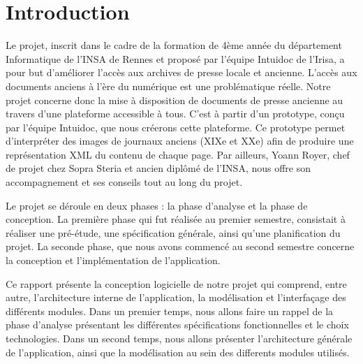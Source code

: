 \section{Introduction}
\label{sec:intro}

Le projet, inscrit dans le cadre de la formation de 4ème année du département Informatique de l’INSA de Rennes et proposé par l’équipe Intuidoc de l’Irisa, a pour but d’améliorer l’accès aux archives de presse locale et ancienne. L’accès aux documents anciens à l’ère du numérique est une problématique réelle. Notre projet concerne donc la mise à disposition de documents de presse ancienne au travers d’une plateforme accessible à tous. C’est à partir d’un prototype, conçu par l’équipe Intuidoc, que nous créerons cette plateforme.
Ce prototype permet d’interpréter des images de journaux anciens (XIXe et XXe) afin de produire une représentation XML du contenu de chaque page. Par ailleurs, Yoann Royer, chef de projet chez Sopra Steria et ancien diplômé de l’INSA, nous offre son accompagnement et ses conseils tout au long du projet.

Le projet se déroule en deux phases : la phase d'analyse et la phase de conception. La première phase qui fut réalisée au premier semestre, consistait à réaliser une pré-étude, une spécification générale, ainsi qu'une planification  du projet. La seconde phase, que nous avons commencé au second semestre concerne la conception et l'implémentation de l'application.

Ce rapport présente la conception logicielle de notre projet qui comprend, entre autre, l'architecture interne de l'application, la modélisation et l'interfaçage des différents modules. Dans un premier temps, nous allons faire un rappel de la phase d'analyse présentant les différentes spécifications fonctionnelles et le choix technologies. Dans un second temps, nous allons présenter l'architecture générale de l'application, ainsi que la modélisation au sein des differents modules utilisés.
